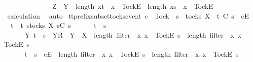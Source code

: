 \begin{isabellebody}
\ \ \ \ \ \ \ \ \ \ \ \ \ \ Z\ {\isasymsubseteq}\ Y\ {\isasymand}\ length\ {\isacharbrackleft}x{\isasymleftarrow}t\ {\isachardot}\ x\ {\isacharequal}\ {\isacharbrackleft}Tock{\isacharbrackright}\isactrlsub E{\isacharbrackright}\ {\isacharequal}\ length\ {\isacharbrackleft}x{\isasymleftarrow}s\ {\isachardot}\ x\ {\isacharequal}\ {\isacharbrackleft}Tock{\isacharbrackright}\isactrlsub E{\isacharbrackright}{\isacharparenright}{\isacharparenright}{\isacharparenright}{\isachardoublequoteclose}\isanewline
\ \ \ \ \isamarkupfalse%
\ calculation\ \isamarkupfalse%
\ auto\isanewline
{}\isamarkupfalse%
%
\endisatagproof
{\isafoldproof}%
%
\isadelimproof
\isanewline
%
\endisadelimproof
\isanewline
{}\isamarkupfalse%
\ tt{\isacharunderscore}prefix{\isacharunderscore}subset{\isacharunderscore}tocks{\isacharunderscore}event{\isacharcolon}\ {\isachardoublequoteopen}e\ {\isasymnoteq}\ Tock\ {\isasymLongrightarrow}\ s\ {\isasymin}\ tocks\ X\ {\isasymLongrightarrow}\ t\ {\isasymlesssim}\isactrlsub C\ s\ {\isacharat}\ {\isacharbrackleft}{\isacharbrackleft}e{\isacharbrackright}\isactrlsub E{\isacharbrackright}\ {\isasymLongrightarrow}\isanewline
\ \ t\ {\isasymin}\ {\isacharbraceleft}t{\isachardot}\ {\isasymexists}s{\isacharprime}{\isasymin}tocks\ X{\isachardot}\ s{\isacharprime}{\isasymlesssim}\isactrlsub C\ s\ {\isasymand}\ \isanewline
\ \ \ \ {\isacharparenleft}t\ {\isacharequal}\ s{\isacharprime}\ {\isasymor}\ \isanewline
\ \ \ \ \ \ {\isacharparenleft}{\isasymexists}Y{\isachardot}\ t\ {\isacharequal}\ s{\isacharprime}\ {\isacharat}\ {\isacharbrackleft}{\isacharbrackleft}Y{\isacharbrackright}\isactrlsub R{\isacharbrackright}\ {\isasymand}\ Y\ {\isasymsubseteq}\ X\ {\isasymand}\ length\ {\isacharparenleft}filter\ {\isacharparenleft}{\isasymlambda}\ x{\isachardot}\ x\ {\isacharequal}\ {\isacharbrackleft}Tock{\isacharbrackright}\isactrlsub E{\isacharparenright}\ s{\isacharprime}{\isacharparenright}\ {\isacharless}\ length\ {\isacharparenleft}filter\ {\isacharparenleft}{\isasymlambda}\ x{\isachardot}\ x\ {\isacharequal}\ {\isacharbrackleft}Tock{\isacharbrackright}\isactrlsub E{\isacharparenright}\ s{\isacharparenright}{\isacharparenright}\ {\isasymor}\isanewline
\ \ \ \ \ \ {\isacharparenleft}t\ {\isacharequal}\ s{\isacharprime}\ {\isacharat}\ {\isacharbrackleft}{\isacharbrackleft}e{\isacharbrackright}\isactrlsub E{\isacharbrackright}\ {\isasymand}\ length\ {\isacharparenleft}filter\ {\isacharparenleft}{\isasymlambda}\ x{\isachardot}\ x\ {\isacharequal}\ {\isacharbrackleft}Tock{\isacharbrackright}\isactrlsub E{\isacharparenright}\ s{\isacharprime}{\isacharparenright}\ {\isacharequal}\ length\ {\isacharparenleft}filter\ {\isacharparenleft}{\isasymlambda}\ x{\isachardot}\ x\ {\isacharequal}\ {\isacharbrackleft}Tock{\isacharbrackright}\isactrlsub E{\isacharparenright}\ s{\isacharparenright}{\isacharparenright}{\isacharparenright}{\isacharbraceright}{\isachardoublequoteclose}\isanewline

\end{isabellebody}
